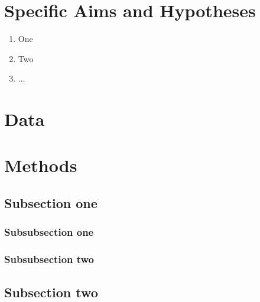 \documentclass[12pt]{article}
\begin{document}
\newpage
\section{Specific Aims and Hypotheses}\label{sec:aims}

\begin{enumerate}
\item One

\item Two

\item ...
\end{enumerate}

\newpage
\section{Data}\label{sec:data}

\newpage
\section{Methods}\label{sec:method}


\subsection{Subsection one}\label{sec:subsec1}


\subsubsection{Subsubsection one}\label{sec:subsub1-1}

\subsubsection{Subsubsection two}\label{sec:subsub1-2}


\subsection{Subsection two}\label{sec:subsec2}
\end{document}
